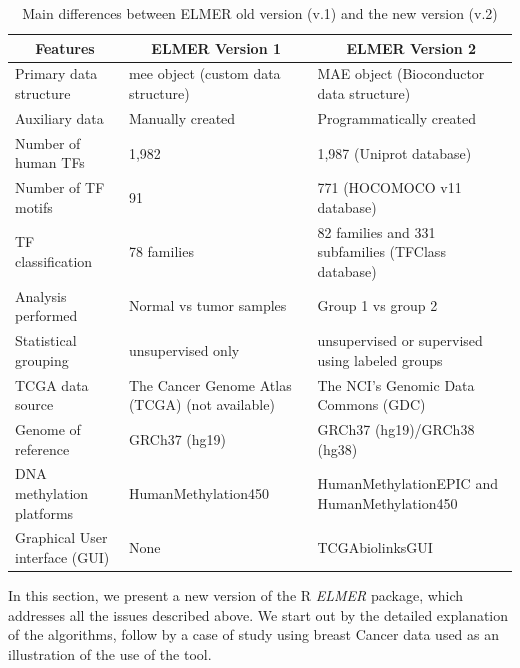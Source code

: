 \begin{table}[h!]
\footnotesize
\centering
\caption{Main differences between ELMER old version (v.1) and the new version (v.2)}
\label{tab:summary}
\begin{tabular}{|p{4cm}|p{5cm}|p{6cm}|}
\toprule
\toprule
\multicolumn{1}{|c|}{\textbf{Features}} & \multicolumn{1}{|c|}{\textbf{ELMER Version 1}} & \multicolumn{1}{|c|}{\textbf{ELMER Version 2}}   \\ \midrule \midrule
Primary data structure   & mee object (custom data structure)   & MAE object (Bioconductor data structure) \\ \hline
Auxiliary data  & Manually created  & Programmatically created \\  \hline
Number of human TFs & 1,982  & 1,987 (Uniprot database)  \\  \hline
Number of TF motifs  & 91  & 771  (HOCOMOCO v11 database)  \\  \hline
TF classification    & 78 families & 82 families and 331 subfamilies \newline(TFClass database) \\  \hline
Analysis performed  & Normal vs tumor samples & Group 1 vs group 2  \\  \hline
Statistical grouping   & unsupervised only & unsupervised or supervised using labeled groups   \\  \hline
TCGA data source   & The Cancer Genome Atlas (TCGA) (not available)          & The NCI's Genomic Data Commons (GDC) \\  \hline
Genome of reference   & GRCh37 (hg19)   & GRCh37 (hg19)/GRCh38 (hg38)          \\ \hline
DNA methylation platforms  & HumanMethylation450   & HumanMethylationEPIC and HumanMethylation450   \\  \hline
Graphical User interface (GUI) & None & TCGAbiolinksGUI \\
\bottomrule
\end{tabular}
\end{table}
\egroup

In this section, we present a new version of the R \textit{ELMER} package,
which addresses all the issues described above. We start out by the detailed explanation
of the algorithms, follow by a case of study using breast Cancer data used as an
illustration of the use of the tool.




